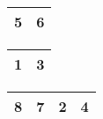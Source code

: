 \begin{frame}
\begin{table}
\begin{tabular}{| c | c |}
\hline
5 & 6 \\ 
\hline
\end{tabular}
\quad
\begin{tabular}{| c | c |}
\hline
\cellcolor{blue!25}1 & \cellcolor{blue!25}3 \\ 
\hline
\end{tabular}
\quad
\begin{tabular}{| c | c | c | c |}
\hline
8 & 7 & 2 & 4 \\ 
\hline
\end{tabular}
\end{table}
\end{frame}


